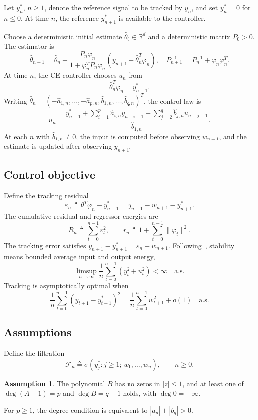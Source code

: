 \documentclass[11pt,reqno]{amsart}
\numberwithin{equation}{section}
\theoremstyle{definition}
\newtheorem{assumption}[theorem]{Assumption}
\theoremstyle{remark}
\newcommand{\R}{\mathbb R}
\newcommand{\F}{\mathcal F}
\newcommand{\thh}{\widehat\theta}
\newcommand{\bhat}{\widehat b}
\newcommand{\ahat}{\widehat a}
\newcommand{\ph}{\varphi}
\newcommand{\as}{\quad\text{a.s.}}
\begin{document}
Let $y_n^*$, $n\ge1$, denote the reference signal to be tracked by $y_n$, and set $y_n^*=0$ for $n\le0$. At time $n$, the reference $y_{n+1}^*$ is available to the controller.

Choose a deterministic initial estimate $\thh_0\in\R^d$ and a deterministic matrix $P_0>0$. The estimator is
\begin{equation}
 \thh_{n+1} =\thh_n+ \frac{P_n\ph_n}{1+\ph_n^TP_n\ph_n} (y_{n+1}-\thh_n^T\ph_n),\label{eq:rls}\quad P_{n+1}^{-1}=P_n^{-1}+\ph_n\ph_n^T.
\end{equation}
At time $n$, the CE controller chooses $u_n$ from
\begin{equation}\label{eq:ce}
 \thh_n^T\ph_n=y_{n+1}^*.
\end{equation}
Writing $\thh_n=(-\ahat_{1,n},\ldots,-\ahat_{p,n},
\bhat_{1,n},\ldots,\bhat_{q,n})^T$, the control law is
\begin{equation}\label{eq:control}
 u_n=
 \frac{y_{n+1}^*+\sum_{i=1}^p\ahat_{i,n}y_{n-i+1}
             -\sum_{j=2}^q\bhat_{j,n}u_{n-j+1}}{\bhat_{1,n}}.
\end{equation}
At each $n$ with $\bhat_{1,n}\ne0$, the input is computed before observing $w_{n+1}$, and the estimate is updated after observing $y_{n+1}$.

\subsection{Control objective}
Define the tracking residual
\[
 \varepsilon_n\triangleq\theta^T\ph_n-y_{n+1}^*=y_{n+1}-w_{n+1}-y_{n+1}^*.
\]
The cumulative residual and regressor energies are
\begin{equation*}
 R_n\triangleq \sum_{t=0}^{n-1}\varepsilon_t^2,\qquad
 r_n\triangleq 1+\sum_{t=0}^{n-1}\|\ph_t\|^2.
\end{equation*}
The tracking error satisfies $y_{n+1}-y_{n+1}^*=\varepsilon_n+w_{n+1}$.
Following~\cite[Section~1.2]{Guo94}, stability means bounded average input and output energy,
\begin{equation*}
 \limsup_{n\to\infty}\frac1n\sum_{t=0}^{n-1}(y_t^2+u_t^2)<\infty\as
\end{equation*}
Tracking is asymptotically optimal when
\begin{equation}\label{eq:tracking-objective}
 \frac1n\sum_{t=0}^{n-1}(y_{t+1}-y_{t+1}^*)^2
 =\frac1n\sum_{t=0}^{n-1}w_{t+1}^2+o(1)\as
\end{equation}

\subsection{Assumptions}
Define the filtration
\[
 \F_n\triangleq \sigma(y_j^*:j\ge1;\,w_1,\ldots,w_n),\qquad n\ge0.
\]
\begin{assumption}\label{ass:plant}
The polynomial $B$ has no zeros in $|z|\le1$, and at least one of
$\deg(A-1)=p$ and $\deg B=q-1$ holds, with $\deg0=-\infty$.
\end{assumption}
For $p\ge1$, the degree condition is equivalent to $|a_p|+|b_q|>0$.
\end{document}
